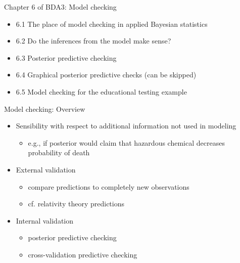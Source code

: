 \documentclass[aspectratio=169]{beamer}
\begin{document}
\begin{frame}{Chapter 6 of BDA3: Model checking}
  \begin{itemize}
  \item 6.1 The place of model checking in applied Bayesian statistics
  \item 6.2 Do the inferences from the model make sense?
  \item 6.3 Posterior predictive checking
  \item 6.4 Graphical posterior predictive checks (can be skipped)
  \item 6.5 Model checking for the educational testing example
  \end{itemize}
  
\end{frame}

  



 \begin{frame}{Model checking: Overview}

  \begin{itemize}
  \item<+-> Sensibility with respect to additional information not used in modeling
    \begin{itemize}
    \item e.g., if posterior would claim that hazardous chemical
      decreases probability of death
    \end{itemize}
  \item<+-> External validation
    \begin{itemize}
    \item compare predictions to completely new observations
    \item cf. relativity theory predictions
    \end{itemize}
  \item<+-> Internal validation
    \begin{itemize}
    \item posterior predictive checking
    \item cross-validation predictive checking
    \end{itemize}
  \end{itemize}

\end{frame}
\end{document}
